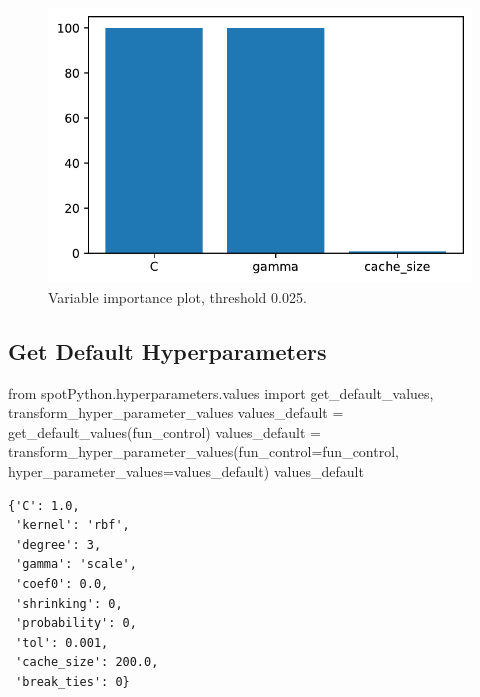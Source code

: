 \documentclass[
  letterpaper,
  DIV=11,
  numbers=noendperiod]{scrreprt}
\newenvironment{Shaded}{\begin{snugshade}}{\end{snugshade}}
\newcommand{\ImportTok}[1]{\textcolor[rgb]{0.00,0.46,0.62}{#1}}
\newcommand{\NormalTok}[1]{\textcolor[rgb]{0.00,0.23,0.31}{#1}}
\newcommand{\OperatorTok}[1]{\textcolor[rgb]{0.37,0.37,0.37}{#1}}
\begin{document}
\begin{figure}[H]

{\centering \includegraphics{18_spot_hpt_sklearn_multiclass_classification_svc_files/figure-pdf/cell-27-output-1.pdf}

}

\caption{Variable importance plot, threshold 0.025.}

\end{figure}

\hypertarget{get-default-hyperparameters-5}{%
\subsection{Get Default
Hyperparameters}\label{get-default-hyperparameters-5}}

\begin{Shaded}
\begin{Highlighting}[]
\ImportTok{from}\NormalTok{ spotPython.hyperparameters.values }\ImportTok{import}\NormalTok{ get\_default\_values, transform\_hyper\_parameter\_values}
\NormalTok{values\_default }\OperatorTok{=}\NormalTok{ get\_default\_values(fun\_control)}
\NormalTok{values\_default }\OperatorTok{=}\NormalTok{ transform\_hyper\_parameter\_values(fun\_control}\OperatorTok{=}\NormalTok{fun\_control, hyper\_parameter\_values}\OperatorTok{=}\NormalTok{values\_default)}
\NormalTok{values\_default}
\end{Highlighting}
\end{Shaded}

\begin{verbatim}
{'C': 1.0,
 'kernel': 'rbf',
 'degree': 3,
 'gamma': 'scale',
 'coef0': 0.0,
 'shrinking': 0,
 'probability': 0,
 'tol': 0.001,
 'cache_size': 200.0,
 'break_ties': 0}
\end{verbatim}
\end{document}
